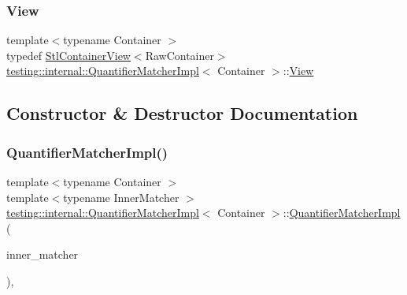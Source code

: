 \subsubsection{\texorpdfstring{View}{View}}
{\footnotesize\ttfamily template$<$typename Container $>$ \\
typedef \hyperlink{classtesting_1_1internal_1_1_stl_container_view}{Stl\+Container\+View}$<$Raw\+Container$>$ \hyperlink{classtesting_1_1internal_1_1_quantifier_matcher_impl}{testing\+::internal\+::\+Quantifier\+Matcher\+Impl}$<$ Container $>$\+::\hyperlink{classtesting_1_1internal_1_1_quantifier_matcher_impl_aa1e6b1653b6fdee1b0cfc4c58a9059e6}{View}}



\subsection{Constructor \& Destructor Documentation}
\mbox{\label{classtesting_1_1internal_1_1_quantifier_matcher_impl_aef125c9971ea1d02d138cd8fd2af0287}} 
\subsubsection{\texorpdfstring{Quantifier\+Matcher\+Impl()}{QuantifierMatcherImpl()}}
{\footnotesize\ttfamily template$<$typename Container $>$ \\
template$<$typename Inner\+Matcher $>$ \\
\hyperlink{classtesting_1_1internal_1_1_quantifier_matcher_impl}{testing\+::internal\+::\+Quantifier\+Matcher\+Impl}$<$ Container $>$\+::\hyperlink{classtesting_1_1internal_1_1_quantifier_matcher_impl}{Quantifier\+Matcher\+Impl} (\begin{DoxyParamCaption}\item[{Inner\+Matcher}]{inner\+\_\+matcher }\end{DoxyParamCaption})\hspace{0.3cm}{\ttfamily [inline]}, {\ttfamily [explicit]}}



